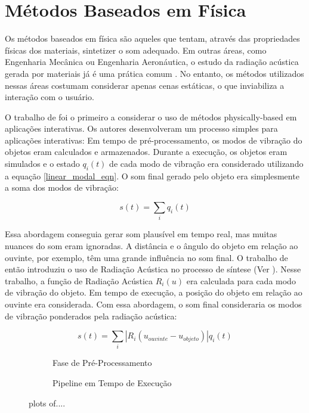 \section{Métodos Baseados em Física}

Os métodos baseados em física são aqueles que tentam, através das propriedades físicas dos materiais, sintetizer o som adequado. Em outras áreas, como Engenharia Mecânica ou Engenharia Aeronáutica, o estudo da radiação acústica gerada por materiais já é uma prática comum \cite{pierce1981acoustics}. No entanto, os métodos utilizados nessas áreas costumam considerar apenas cenas estáticas, o que inviabiliza a interação com o usuário.

O trabalho de \cite{van2001foleyautomatic} foi o primeiro a considerar o uso de métodos physically-based em aplicações interativas. Os autores desenvolveram um processo simples para aplicações interativas: Em tempo de pré-processamento, os modos de vibração do objetos eram calculados e armazenados. Durante a execução, os objetos eram simulados e o estado $q_i(t)$ de cada modo de vibração era considerado utilizando a equação \eqref{linear_modal_eqn}. O som final gerado pelo objeto era simplesmente a soma dos modos de vibração:

\begin{equation}
	s(t) = \sum_i q_i(t)
\end{equation}

Essa abordagem conseguia gerar som plausível em tempo real, mas muitas nuances do som eram ignoradas. A distância e o ângulo do objeto em relação ao ouvinte, por exemplo, têm uma grande influência no som final. O trabalho de \cite{james2006precomputed} então introduziu o uso de Radiação Acústica no processo de síntese (Ver ). Nesse trabalho, a função de Radiação Acústica $R_i(u)$ era calculada para cada modo de vibração do objeto. Em tempo de execução, a posição do objeto em relação ao ouvinte era considerada. Com essa abordagem, o som final consideraria os modos de vibração ponderados pela radiação acústica: 

\begin{equation}
	s(t) = \sum_i |R_i(u_{ouvinte}-u_{objeto})| q_i(t)
\end{equation}

\begin{figure}[ht]
\begin{subfigure}{\textwidth}
	\centering
	
	\caption{Fase de Pré-Processamento}\label{pipeline_offline}
\end{subfigure}
\begin{subfigure}{\textwidth}
	\centering
	
	\caption{Pipeline em Tempo de Execução}\label{pipeline_online}
\end{subfigure}
\caption[Overview do pipeline]{ plots of....}
\label{fig:pipeline_overview}
\end{figure}

